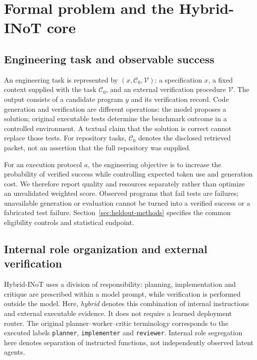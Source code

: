 \section{Formal problem and the Hybrid-INoT core}
\label{sec:hybrid-core}

\subsection{Engineering task and observable success}
An engineering task is represented by $(x,\mathcal{C}_0,\mathcal{V})$: a specification $x$, a fixed context supplied with the task $\mathcal{C}_0$, and an external verification procedure $\mathcal{V}$. The output consists of a candidate program $y$ and its verification record. Code generation and verification are different operations: the model proposes a solution; original executable tests determine the benchmark outcome in a controlled environment. A textual claim that the solution is correct cannot replace those tests. For repository tasks, $\mathcal{C}_0$ denotes the disclosed retrieved packet, not an assertion that the full repository was supplied.

For an execution protocol $a$, the engineering objective is to increase the probability of verified success while controlling expected token use and generation cost. We therefore report quality and resources separately rather than optimize an unvalidated weighted score. Observed programs that fail tests are failures; unavailable generation or evaluation cannot be turned into a verified success or a fabricated test failure. Section~\ref{sec:heldout-methods} specifies the common eligibility controls and statistical endpoint.

\subsection{Internal role organization and external verification}
Hybrid-INoT uses a division of responsibility: planning, implementation and critique are prescribed within a model prompt, while verification is performed outside the model. Here, \emph{hybrid} denotes this combination of internal instructions and external executable evidence. It does not require a learned deployment router. The original planner--worker--critic terminology corresponds to the executed labels \texttt{planner}, \texttt{implementer} and \texttt{reviewer}. Internal role segregation here denotes separation of instructed functions, not independently observed latent agents.

